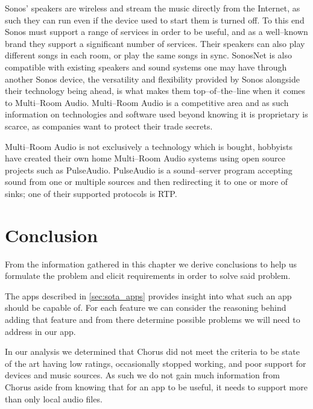 Sonos' speakers are wireless and stream the music directly from the Internet, as such they can run even if the device used to start them is turned off.
To this end Sonos must support a range of services in order to be useful, and as a well--known brand they support a significant number of services.
Their speakers can also play different songs in each room, or play the same songs in sync.
SonosNet is also compatible with existing speakers and sound systems one may have through another Sonos device, the versatility and flexibility provided by Sonos alongside their technology being ahead, is what makes them top--of--the--line when it comes to Multi--Room Audio.\cite{sonos2}
Multi--Room Audio is a competitive area and as such information on technologies and software used beyond knowing it is proprietary is scarce, as companies want to protect their trade secrets.

Multi--Room Audio is not exclusively a technology which is bought, hobbyists have created their own home Multi--Room Audio systems using open source projects such as PulseAudio.\cite{pulseAudioHobbyist}
PulseAudio is a sound--server program accepting sound from one or multiple sources and then redirecting it to one or more of sinks; one of their supported protocols is \ac{RTP}.\cite{pulseAudioModules}

\section{Conclusion}
From the information gathered in this chapter we derive conclusions to help us formulate the problem and elicit requirements in order to solve said problem.

\bigskip
The apps described in \cref{sec:sota_apps} provides insight into what such an app should be capable of.
For each feature we can consider the reasoning behind adding that feature and from there determine possible problems we will need to address in our app.

In our analysis we determined that Chorus did not meet the criteria to be state of the art having low ratings, occasionally stopped working, and poor support for devices and music sources.
As such we do not gain much information from Chorus aside from knowing that for an app to be useful, it needs to support more than only local audio files.

